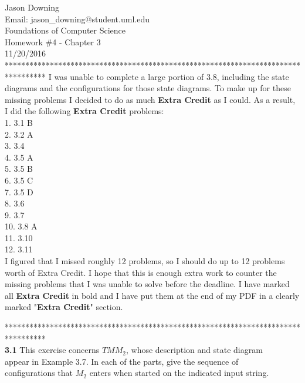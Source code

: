 \documentclass[12pt]{article}
\begin{document}
\noindent
Jason Downing \\
Email: jason\_downing@student.uml.edu \\
Foundations of Computer Science \\
Homework \#4 - Chapter 3 \\
11/20/2016 \\

**********************************************************************************
I was unable to complete a large portion of 3.8, including the state diagrams
and the configurations for those state diagrams. To make up for these missing 
problems I decided to do as much \textbf{Extra Credit} as I could. As a result, 
I did the following \textbf{Extra Credit} problems: \\

1. 3.1 B \\
2. 3.2 A \\
3. 3.4 \\
4. 3.5 A \\
5. 3.5 B \\
6. 3.5 C \\
7. 3.5 D \\
8. 3.6 \\ 
9. 3.7 \\
10. 3.8 A \\ 
11. 3.10 \\
12. 3.11 \\

I figured that I missed roughly 12 problems, so I should do up to 12 problems
worth of Extra Credit. I hope that this is enough extra work to counter the
missing problems that I was unable to solve before the deadline. I have marked
all \textbf{Extra Credit} in bold and I have put them at the end of my PDF in
a clearly marked "\textbf{Extra Credit}" section.

********************************************************************************** \\

\pagebreak
\noindent
\textbf{3.1} This exercise concerns $TM M_2$, whose description and state diagram \\
appear in Example 3.7. In each of the parts, give the sequence of \\
configurations that $M_2$ enters when started on the indicated input string. \\
\end{document}
